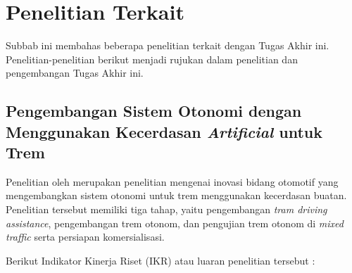 
\section{Penelitian Terkait}

Subbab ini membahas beberapa penelitian terkait dengan Tugas Akhir ini.
Penelitian-penelitian berikut menjadi rujukan dalam penelitian dan pengembangan
Tugas Akhir ini.

\subsection{Pengembangan Sistem Otonomi dengan Menggunakan Kecerdasan \textit{Artificial} untuk Trem}
\label{subsec:rispro-trilaksono}

Penelitian oleh \cite{rispro-trilaksono} merupakan penelitian mengenai inovasi
bidang otomotif yang mengembangkan sistem otonomi untuk trem menggunakan
kecerdasan buatan. Penelitian tersebut memiliki tiga tahap, yaitu pengembangan
\textit{tram driving assistance}, pengembangan trem otonom, dan pengujian trem
otonom di \textit{mixed traffic} serta persiapan komersialisasi.

Berikut Indikator Kinerja Riset (IKR) atau luaran penelitian tersebut
\parencite{rispro-trilaksono}:

